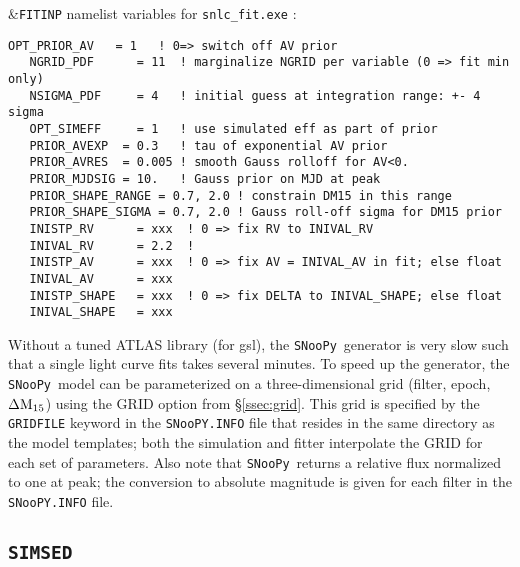 \documentclass[12pt]{article}
\newcommand{\snoopy}{{\tt SNooPy}}
\newcommand{\SIMSED}{{\tt SIMSED}}
\newcommand{\DMXV}{\Delta{\rm M}_{15}}
\begin{document}
\bigskip
\noindent
\&{\tt FITINP} namelist variables  for {\tt snlc\_fit.exe} :
\begin{Verbatim}[frame=single]
   OPT_PRIOR_AV   = 1   ! 0=> switch off AV prior
   NGRID_PDF      = 11  ! marginalize NGRID per variable (0 => fit min only)
   NSIGMA_PDF     = 4   ! initial guess at integration range: +- 4 sigma
   OPT_SIMEFF     = 1   ! use simulated eff as part of prior 
   PRIOR_AVEXP  = 0.3   ! tau of exponential AV prior
   PRIOR_AVRES  = 0.005 ! smooth Gauss rolloff for AV<0.
   PRIOR_MJDSIG = 10.   ! Gauss prior on MJD at peak
   PRIOR_SHAPE_RANGE = 0.7, 2.0 ! constrain DM15 in this range
   PRIOR_SHAPE_SIGMA = 0.7, 2.0 ! Gauss roll-off sigma for DM15 prior
   INISTP_RV      = xxx  ! 0 => fix RV to INIVAL_RV
   INIVAL_RV      = 2.2  ! 
   INISTP_AV      = xxx  ! 0 => fix AV = INIVAL_AV in fit; else float
   INIVAL_AV      = xxx 
   INISTP_SHAPE   = xxx  ! 0 => fix DELTA to INIVAL_SHAPE; else float
   INIVAL_SHAPE   = xxx
\end{Verbatim}
%
Without a tuned ATLAS library (for gsl), the \snoopy\ generator
is very slow such that a single light curve fits takes several 
minutes. To speed up the generator, the \snoopy\ model can be
parameterized on a three-dimensional grid 
(filter, epoch, $\DMXV$) using the
GRID option from \S\ref{ssec:grid}.
This grid is specified by the {\tt GRIDFILE} keyword
in the {\tt SNooPY.INFO} file that resides in the same
directory as the model templates; both the simulation
and fitter interpolate the GRID for each set of
parameters.
Also note that \snoopy\ returns a relative flux
normalized to one at peak; the conversion to absolute
magnitude is given for each filter in the {\tt SNooPY.INFO} file.

\clearpage
\subsection{{\SIMSED}}
\label{subsec:SIMSED}
\end{document}
